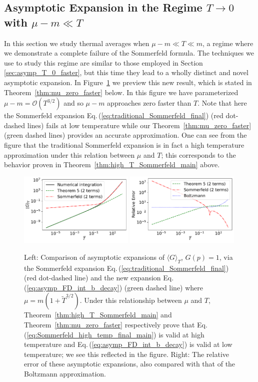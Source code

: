 \documentclass[sn-mathphys,Numbered]{sn-jnl}
\newcommand{\req}[1]{Eq.\,(\ref{#1})}
\newcommand{\rf}[1]{Figure~{\ref{#1}}}
\newcommand{\rTh}[1]{Theorem~{\ref{#1}}}
\begin{document}
\subsection{Asymptotic Expansion in the Regime $T\to 0$ with $\mu-m\ll T$}\label{sec:asympt_Delta_mu_order_T}
In this section we study thermal averages when $\mu-m\ll T\ll m$, a regime where we demonstrate a complete failure of the Sommerfeld formula. The techniques we use   to study this regime are similar to those employed in Section \ref{sec:asymp_T_0_faster}, but this time they lead to a wholly distinct and novel asymptotic expansion. In \rf{fig:FD_avg_expansion_comparison_Sommerfeld} we preview this new result, which is stated in \rTh{thm:mu_zero_faster} below. In this figure we have parameterized $\mu-m=\mathcal{O}(T^{3/2})$ and so $\mu-m$ approaches zero faster than $T$. Note that here the Sommerfeld expansion \req{eq:traditional_Sommerfeld_final} (red dot-dashed lines) fails at low temperature while our \rTh{thm:mu_zero_faster} (green dashed lines) provides an accurate approximation. One can see from the figure that the traditional Sommerfeld expansion is in fact a high temperature approximation under this relation between $\mu$ and $T$; this corresponds to the behavior proven in \rTh{thm:high_T_Sommerfeld_main} above.

\begin{figure}%
\centering
\includegraphics[width=0.49\textwidth]{./plot/Sommerfeld_high_temp_comparison.pdf}
\includegraphics[width=0.49\textwidth]{./plot/Sommerfeld_high_temp_relative_error_comparison.pdf}
\caption{Left: Comparison of asymptotic expansions of $\langle G\rangle_{T}$, $G(p)=1$, via the Sommerfeld expansion \req{eq:traditional_Sommerfeld_final} (red dot-dashed line) and the new expansion \req{eq:asymp_FD_int_b_decay} (green dashed line) where $\mu=m(1+\widetilde{T}^{3/2})$. Under this relationship between $\mu$ and $T$, \rTh{thm:high_T_Sommerfeld_main} and \rTh{thm:mu_zero_faster} respectively prove that \req{eq:Sommerfeld_high_temp_final_main} is valid at high temperature and \req{eq:asymp_FD_int_b_decay} is valid at low temperature; we see this reflected in the figure. Right: The relative error of these asymptotic expansions, also compared with that of the Boltzmann approximation. }\label{fig:FD_avg_expansion_comparison_Sommerfeld}
\end{figure}
\end{document}
